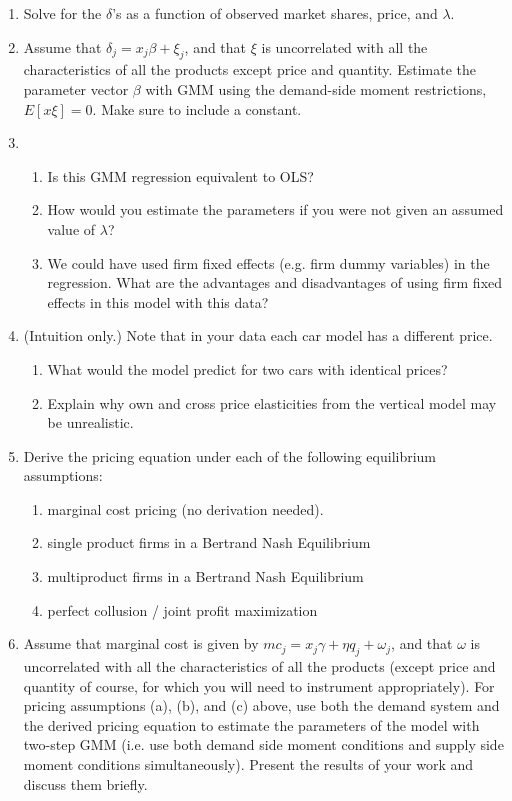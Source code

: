 \documentclass[12pt]{article}
\begin{document}
\begin{enumerate}
\item Solve for the \(\delta\)'s as a function of observed market shares, price, and \(\lambda\).
\item Assume that $\delta _{j}=x_{j}\beta +\xi _{j}$, and that $\xi $ is uncorrelated with all the characteristics of all the products except price and quantity. Estimate the parameter vector \(\beta\) with GMM using the demand-side moment restrictions, $E[x\xi] = 0$. Make sure to include a constant.
\item
    \begin{enumerate}
    \item Is this GMM regression equivalent to OLS?
    \item How would you estimate the parameters if you were not given an assumed value of \(\lambda\)?
    \item We could have used firm fixed effects (e.g. firm dummy variables) in the regression. What are the advantages and disadvantages of using firm fixed effects in this model with this data?
	\end{enumerate}

\item (Intuition only.)  Note that in your data each car model has a different price.
    \begin{enumerate}
    \item What would the model predict for two cars with identical prices?
    \item Explain why own and cross price elasticities from the vertical model may be unrealistic.
    \end{enumerate}
\item Derive the pricing equation under each of the following equilibrium assumptions:
	
		\begin{enumerate}
		\item marginal cost pricing (no derivation needed).
		
		\item single product firms in a Bertrand Nash Equilibrium
		
		\item multiproduct firms in a Bertrand Nash Equilibrium

        \item perfect collusion / joint profit maximization
		\end{enumerate}	

\item Assume that marginal cost is given by $mc_{j}=x_{j}\gamma +\eta
q_{j}+\omega _{j}$, and that $\omega $ is uncorrelated with all the characteristics of all the products (except price and quantity of course, for which you will need to instrument appropriately). For pricing assumptions (a), (b), and (c) above, use both the demand system and the derived pricing equation to estimate the parameters of the model with two-step GMM (i.e. use both demand side moment conditions and supply side moment conditions simultaneously). Present the results of your work and discuss them briefly.

\end{enumerate}
\end{document}
